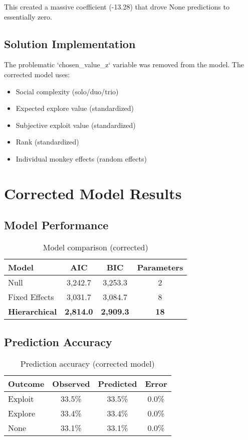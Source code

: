 \documentclass[11pt]{article}
\begin{document}
This created a massive coefficient (-13.28) that drove None predictions to essentially zero.

\subsection{Solution Implementation}

The problematic `chosen\_value\_z` variable was removed from the model. The corrected model uses:
\begin{itemize}
    \item Social complexity (solo/duo/trio)
    \item Expected explore value (standardized)
    \item Subjective exploit value (standardized)
    \item Rank (standardized)
    \item Individual monkey effects (random effects)
\end{itemize}

\section{Corrected Model Results}

\subsection{Model Performance}

\begin{table}[h]
\centering
\begin{tabular}{lccc}
\toprule
\textbf{Model} & \textbf{AIC} & \textbf{BIC} & \textbf{Parameters} \\
\midrule
Null & 3,242.7 & 3,253.3 & 2 \\
Fixed Effects & 3,031.7 & 3,084.7 & 8 \\
\textbf{Hierarchical} & \textbf{2,814.0} & \textbf{2,909.3} & \textbf{18} \\
\bottomrule
\end{tabular}
\caption{Model comparison (corrected)}
\end{table}

\subsection{Prediction Accuracy}

\begin{table}[h]
\centering
\begin{tabular}{lccc}
\toprule
\textbf{Outcome} & \textbf{Observed} & \textbf{Predicted} & \textbf{Error} \\
\midrule
Exploit & 33.5\% & 33.5\% & 0.0\% \\
Explore & 33.4\% & 33.4\% & 0.0\% \\
None & 33.1\% & 33.1\% & 0.0\% \\
\bottomrule
\end{tabular}
\caption{Prediction accuracy (corrected model)}
\end{table}
\end{document}
